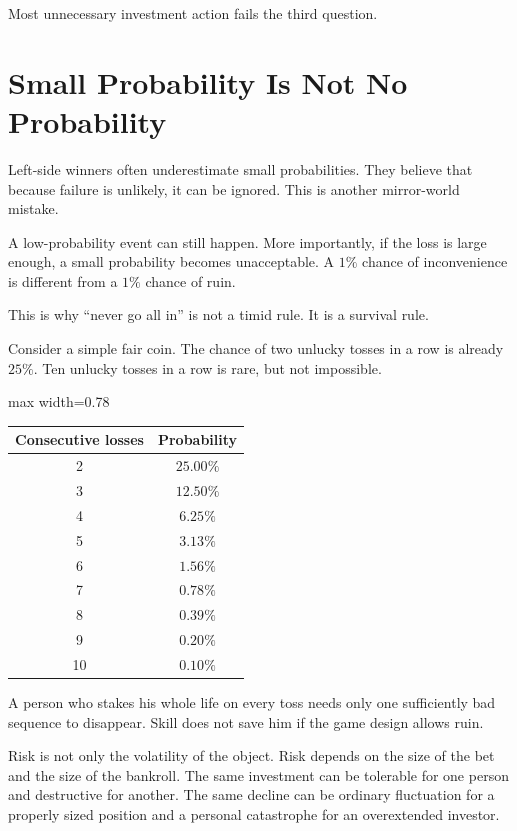 Most unnecessary investment action fails the third question.

\section*{Small Probability Is Not No Probability}

Left-side winners often underestimate small probabilities. They believe that because failure is unlikely, it can be ignored. This is another mirror-world mistake.

A low-probability event can still happen. More importantly, if the loss is large enough, a small probability becomes unacceptable. A \(1\%\) chance of inconvenience is different from a \(1\%\) chance of ruin.

This is why ``never go all in'' is not a timid rule. It is a survival rule.

Consider a simple fair coin. The chance of two unlucky tosses in a row is already \(25\%\). Ten unlucky tosses in a row is rare, but not impossible.

\begin{center}
\begin{adjustbox}{max width=0.78\linewidth}
\begin{tabular}{cc}
\hline
Consecutive losses & Probability \\
\hline
2 & \(25.00\%\) \\
3 & \(12.50\%\) \\
4 & \(6.25\%\) \\
5 & \(3.13\%\) \\
6 & \(1.56\%\) \\
7 & \(0.78\%\) \\
8 & \(0.39\%\) \\
9 & \(0.20\%\) \\
10 & \(0.10\%\) \\
\hline
\end{tabular}
\end{adjustbox}
\end{center}

A person who stakes his whole life on every toss needs only one sufficiently bad sequence to disappear. Skill does not save him if the game design allows ruin.

Risk is not only the volatility of the object. Risk depends on the size of the bet and the size of the bankroll. The same investment can be tolerable for one person and destructive for another. The same decline can be ordinary fluctuation for a properly sized position and a personal catastrophe for an overextended investor.


